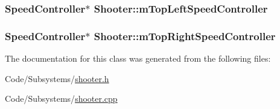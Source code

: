 \hypertarget{class_shooter_a88b8889b38ca1b0da9d49da67305a8d0}{
\subsubsection[{m\-Top\-Left\-Speed\-Controller}]{\setlength{\rightskip}{0pt plus 5cm}\-Speed\-Controller$\ast$ {\bf \-Shooter\-::m\-Top\-Left\-Speed\-Controller}}}\label{class_shooter_a88b8889b38ca1b0da9d49da67305a8d0}
\hypertarget{class_shooter_a2fbf3fc001d31b3c360624b36894c47d}{
\subsubsection[{m\-Top\-Right\-Speed\-Controller}]{\setlength{\rightskip}{0pt plus 5cm}\-Speed\-Controller$\ast$ {\bf \-Shooter\-::m\-Top\-Right\-Speed\-Controller}}}\label{class_shooter_a2fbf3fc001d31b3c360624b36894c47d}


\-The documentation for this class was generated from the following files\-:\begin{DoxyCompactItemize}
\item 
\-Code/\-Subsystems/\hyperlink{shooter_8h}{shooter.\-h}\item 
\-Code/\-Subsystems/\hyperlink{shooter_8cpp}{shooter.\-cpp}\end{DoxyCompactItemize}
